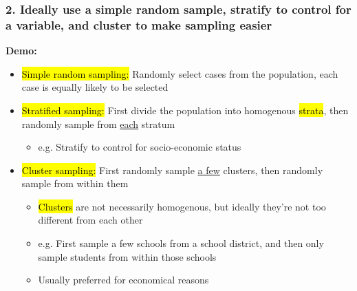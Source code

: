\documentclass[11pt,containsverbatim,handout,xcolor=xelatex,dvipsnames,table]{beamer}
\begin{document}
\begin{frame}
\frametitle{2. Ideally use a simple random sample, stratify to control for a variable, and cluster to make sampling easier}

\begin{center}
\textbf{Demo:} 
\end{center}

\begin{itemize}
\item \hl{Simple random sampling:} Randomly select cases from the population, each case is equally likely to be selected

\item \hl{Stratified sampling:} First divide the population into homogenous \hl{strata}, then randomly sample from \underline{each} stratum
\begin{itemize}
\item e.g. Stratify to control for socio-economic status
\end{itemize}

\item \hl{Cluster sampling:} First randomly sample \underline{a few} clusters, then randomly sample from within them
\begin{itemize}
\item \hl{Clusters} are not necessarily homogenous, but ideally they're not too different from each other
\item e.g. First sample a few schools from a school district, and then only sample students from within those schools
\item Usually preferred for economical reasons
\end{itemize}

\end{itemize}

\end{frame}
\end{document}
